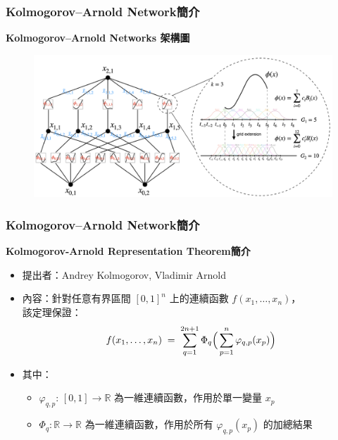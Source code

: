 \documentclass{beamer}
\begin{document}
\begin{frame}
    \frametitle{Kolmogorov–Arnold Network簡介}
    \centering
    \textbf{Kolmogorov–Arnold Networks 架構圖}\\
    \begin{figure}               %
    \centering                 %
    \includegraphics[width=\textwidth,keepaspectratio]{figures/KAN架構.png}
    \end{figure}
\end{frame}

\begin{frame}
    \frametitle{Kolmogorov–Arnold Network簡介}
    \centering
    \textbf{Kolmogorov-Arnold Representation Theorem簡介}\\[0.5cm]
    \begin{itemize}
    \item 提出者：Andrey Kolmogorov, Vladimir Arnold
    \item 內容：針對任意有界區間 $[0,1]^n$ 上的連續函數 $f(x_1,\dots,x_n)$，\\\hspace*{3em}該定理保證：
      \begin{equation*}\label{eq:kat}
        f(x_1,\dots,x_n)
        \;=\;
        \sum_{q=1}^{2n+1}
        \Phi_q\Bigl(\,\sum_{p=1}^n \varphi_{q,p}(x_p)\Bigr)
      \end{equation*}
    \item 其中：
      \begin{itemize}
        \item $\varphi_{q,p}:\,[0,1]\to\mathbb{R}$ 為一維連續函數，作用於單一變量 $x_p$
        \item $\Phi_q:\mathbb{R}\to\mathbb{R}$ 為一維連續函數，作用於所有 $\varphi_{q,p}(x_p)$ 的加總結果
      \end{itemize}
  \end{itemize}
\end{frame}
\end{document}
